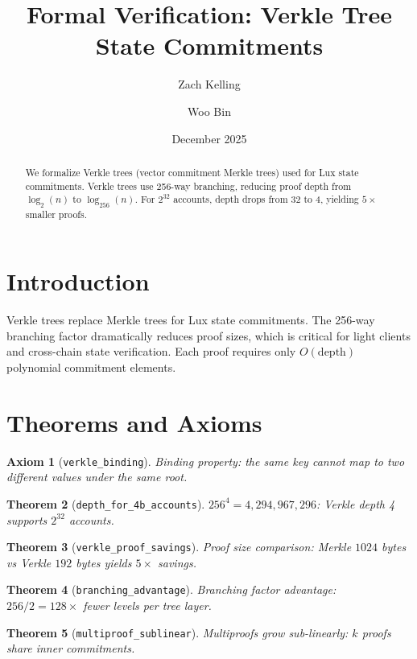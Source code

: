 \documentclass[11pt]{article}
\title{Formal Verification: Verkle Tree State Commitments}
\author{Zach Kelling \and Woo Bin}
\date{December 2025}
\newtheorem{theorem}{Theorem}
\newtheorem{axiom_stmt}[theorem]{Axiom}
\begin{document}
\maketitle

\begin{abstract}
We formalize Verkle trees (vector commitment Merkle trees) used for Lux state commitments. Verkle trees use 256-way branching, reducing proof depth from $\log_2(n)$ to $\log_{256}(n)$. For $2^{32}$ accounts, depth drops from 32 to 4, yielding $5\times$ smaller proofs.
\end{abstract}

\section{Introduction}
Verkle trees replace Merkle trees for Lux state commitments. The 256-way branching factor dramatically reduces proof sizes, which is critical for light clients and cross-chain state verification. Each proof requires only $O(\text{depth})$ polynomial commitment elements.

\section{Theorems and Axioms}
\begin{axiom_stmt}[\texttt{verkle\_binding}]
Binding property: the same key cannot map to two different values under the same root.
\end{axiom_stmt}

\begin{theorem}[\texttt{depth\_for\_4b\_accounts}]
$256^4 = 4{,}294{,}967{,}296$: Verkle depth 4 supports $2^{32}$ accounts.
\end{theorem}

\begin{theorem}[\texttt{verkle\_proof\_savings}]
Proof size comparison: Merkle $1024$ bytes vs Verkle $192$ bytes yields $5\times$ savings.
\end{theorem}

\begin{theorem}[\texttt{branching\_advantage}]
Branching factor advantage: $256/2 = 128\times$ fewer levels per tree layer.
\end{theorem}

\begin{theorem}[\texttt{multiproof\_sublinear}]
Multiproofs grow sub-linearly: $k$ proofs share inner commitments.
\end{theorem}
\end{document}
